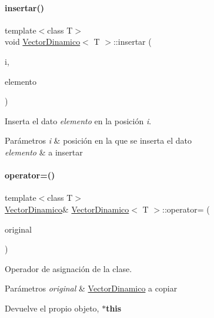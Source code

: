 \paragraph{\texorpdfstring{insertar()}{insertar()}}
{\footnotesize\ttfamily template$<$class T$>$ \\
void \hyperlink{classVectorDinamico}{Vector\+Dinamico}$<$ T $>$\+::insertar (\begin{DoxyParamCaption}\item[{int}]{i,  }\item[{T}]{elemento }\end{DoxyParamCaption})}



Inserta el dato {\itshape elemento} en la posición {\itshape i}. 


\begin{DoxyParams}{Parámetros}
{\em i} & posición en la que se inserta el dato \\
\hline
{\em elemento} & a insertar \\
\hline
\end{DoxyParams}
\mbox{\label{classVectorDinamico_ab2b6991435f3181c33f84e9d9035e960}} 
\paragraph{\texorpdfstring{operator=()}{operator=()}}
{\footnotesize\ttfamily template$<$class T$>$ \\
\hyperlink{classVectorDinamico}{Vector\+Dinamico}\& \hyperlink{classVectorDinamico}{Vector\+Dinamico}$<$ T $>$\+::operator= (\begin{DoxyParamCaption}\item[{const \hyperlink{classVectorDinamico}{Vector\+Dinamico}$<$ T $>$ \&}]{original }\end{DoxyParamCaption})}



Operador de asignación de la clase. 


\begin{DoxyParams}{Parámetros}
{\em original} & {\ttfamily \hyperlink{classVectorDinamico}{Vector\+Dinamico}} a copiar \\
\hline
\end{DoxyParams}
\begin{DoxyReturn}{Devuelve}
el propio objeto, {\bfseries $\ast$this} 
\end{DoxyReturn}
\mbox{\label{classVectorDinamico_ae7640a01e5e7c741ef915ee116272db2}} 

